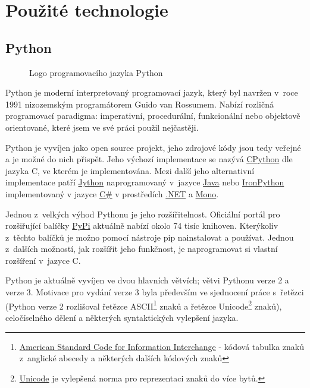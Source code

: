 \section{Použité technologie}

\subsection{Python}
\label{subsec:python}

\begin{wrapfigure}[10]{R}{0.5\textwidth}
 \centering
 
 \caption{Logo programovacího jazyka Python}
\end{wrapfigure}

Python je moderní interpretovaný programovací jazyk, který byl navržen v~roce 1991 nizozemským programátorem Guido van Rossumem. Nabízí rozličná programovací paradigma: imperativní, procedurální, funkcionální nebo objektově orientované, které jsem ve své práci použil nejčastěji.

Python je vyvíjen jako open source projekt, jeho zdrojové kódy jsou tedy veřejné a je možné do nich přispět. Jeho výchozí implementace se nazývá \href{https://en.wikipedia.org/wiki/CPython}{CPython} dle jazyka C, ve kterém je implementována. Mezi další jeho alternativní implementace patří \href{https://cs.wikipedia.org/wiki/Jython}{Jython} naprogramovaný v~jazyce \href{https://cs.wikipedia.org/wiki/Java_%28programovac%C3%AD_jazyk%29}{Java} nebo \href{https://cs.wikipedia.org/wiki/IronPython}{IronPython} implementovaný v jazyce \href{https://cs.wikipedia.org/wiki/C_Sharp}{C\#} v prostředích \href{https://cs.wikipedia.org/wiki/.NET}{.NET} a \href{https://cs.wikipedia.org/wiki/Mono_%28platforma%29}{Mono}.

Jednou z~velkých výhod Pythonu je jeho rozšířitelnost. Oficiální portál pro rozšiřující balíčky \href{https://pypi.python.org/pypi}{PyPi} aktuálně nabízí okolo 74 tisíc knihoven. Kterýkoliv z~těchto balíčků je možno pomocí nástroje pip nainstalovat a používat. Jednou z~dalších možností, jak rozšířit jeho funkčnost, je naprogramovat si vlastní rozšíření v~jazyce C.

\begin{sloppypar}
	Python je aktuálně vyvíjen ve dvou hlavních větvích; větvi Pythonu verze 2 a verze 3. Motivace pro vydání verze 3 byla především ve sjednocení práce s~řetězci (Python verze 2 rozlišoval řetězce ASCII\footnote{\href{https://cs.wikipedia.org/wiki/ASCII}{American Standard Code for Information Interchange} - kódová tabulka znaků z~anglické abecedy a některých dalších kódových znaků} znaků a řetězce Unicode\footnote{\href{https://cs.wikipedia.org/wiki/Unicode}{Unicode} je vylepšená norma pro reprezentaci znaků do více bytů.} znaků), celočíselného dělení a některých syntaktických vylepšení jazyka.
\end{sloppypar}

